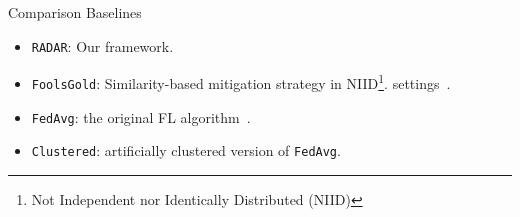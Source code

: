 \begin{frame}{Comparison Baselines}
      \begin{itemize}
        \item \texttt{RADAR}: Our framework.
        \item \texttt{FoolsGold}: Similarity-based mitigation strategy in NIID\footnote{Not Independent nor Identically Distributed (NIID)}. settings~\cite{fung_LimitationsFederatedLearning_2020}.
        \item \texttt{FedAvg}: the original FL algorithm~\cite{mcmahan_Communicationefficientlearningdeep_2017}.
        \item \texttt{Clustered}: artificially clustered version of \texttt{FedAvg}.
      \end{itemize}
\end{frame}
